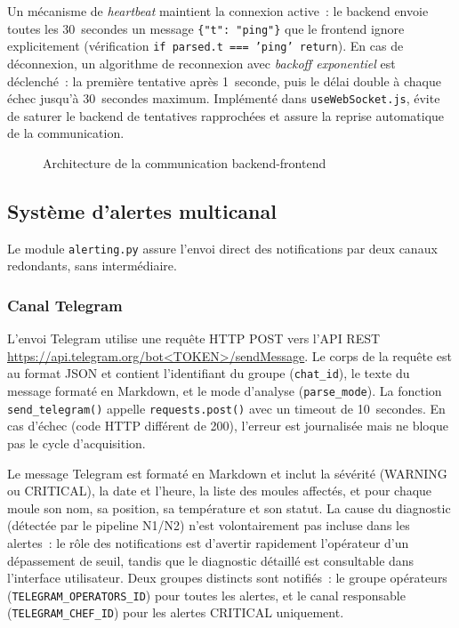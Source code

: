 \noindent Un mécanisme de \emph{heartbeat} maintient la connexion active~: le backend envoie toutes les 30~secondes un message \texttt{\{"t": "ping"\}} que le frontend ignore explicitement (vérification \texttt{if parsed.t === 'ping' return}). En cas de déconnexion, un algorithme de reconnexion avec \emph{backoff exponentiel} est déclenché~: la première tentative après 1~seconde, puis le délai double à chaque échec jusqu'à 30~secondes maximum. Implémenté dans \texttt{useWebSocket.js}, évite de saturer le backend de tentatives rapprochées et assure la reprise automatique de la communication.

\begin{figure}[htbp]
  \centering
  \caption{Architecture de la communication backend-frontend}
  \label{fig:ws_architecture}
\end{figure}

\subsection{Système d'alertes multicanal}

Le module \texttt{alerting.py} assure l'envoi direct des notifications par deux canaux redondants, sans intermédiaire.

\subsubsection{Canal Telegram}

L'envoi Telegram utilise une requête HTTP POST vers l'API REST \url{https://api.telegram.org/bot<TOKEN>/sendMessage}. Le corps de la requête est au format JSON et contient l'identifiant du groupe (\texttt{chat\_id}), le texte du message formaté en Markdown, et le mode d'analyse (\texttt{parse\_mode}). La fonction \texttt{send\_telegram()} appelle \texttt{requests.post()} avec un timeout de 10~secondes. En cas d'échec (code HTTP différent de 200), l'erreur est journalisée mais ne bloque pas le cycle d'acquisition.

Le message Telegram est formaté en Markdown et inclut la sévérité (WARNING ou CRITICAL), la date et l'heure, la liste des moules affectés, et pour chaque moule son nom, sa position, sa température et son statut. La cause du diagnostic (détectée par le pipeline N1/N2) n'est volontairement pas incluse dans les alertes~: le rôle des notifications est d'avertir rapidement l'opérateur d'un dépassement de seuil, tandis que le diagnostic détaillé est consultable dans l'interface utilisateur. Deux groupes distincts sont notifiés~: le groupe opérateurs (\texttt{TELEGRAM\_OPERATORS\_ID}) pour toutes les alertes, et le canal responsable (\texttt{TELEGRAM\_CHEF\_ID}) pour les alertes CRITICAL uniquement.

